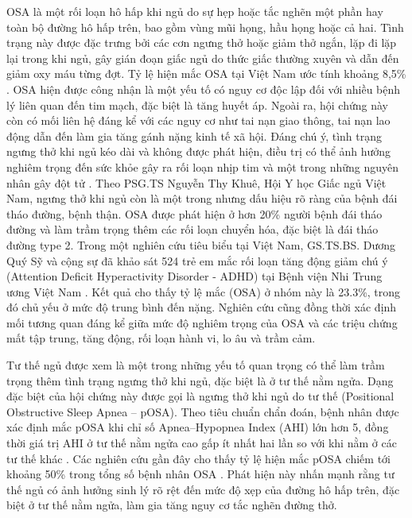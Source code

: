 OSA là một rối loạn hô hấp khi ngủ do sự hẹp hoặc tắc nghẽn một phần hay toàn
bộ đường hô hấp trên, bao gồm vùng mũi họng, hầu họng hoặc cả hai. Tình trạng
này được đặc trưng bởi các cơn ngưng thở hoặc giảm thở ngắn, lặp đi lặp lại
trong khi ngủ, gây gián đoạn giấc ngủ do thức giấc thường xuyên và dẫn đến giảm
oxy máu từng đợt. Tỷ lệ hiện mắc OSA tại Việt Nam ước tính khoảng 8,5\%
\cite{nguoimacOSA_VN}. OSA hiện được công nhận là một yếu tố có nguy cơ độc lập
đối với nhiều bệnh lý liên quan đến tim mạch, đặc biệt là tăng huyết áp. Ngoài
ra, hội chứng này còn có mối liên hệ đáng kể với các nguy cơ như tai nạn giao
thông, tai nạn lao động dẫn đến làm gia tăng gánh nặng kinh tế xã
hội\cite{osa_bike}\cite{Marin2005}. Đáng chú ý, tình trạng ngưng thở khi ngủ
kéo dài và không được phát hiện, điều trị có thể ảnh hưởng nghiêm trọng đến sức
khỏe gây ra rối loạn nhịp tim và một trong những nguyên nhân gây đột tử
\cite{sumarry_osa}. Theo PSG.TS Nguyễn Thy Khuê, Hội Y học Giấc ngủ Việt Nam,
ngưng thở khi ngủ còn là một trong nhưng dấu hiệu rõ ràng của bệnh đái tháo
đường, bệnh thận. OSA được phát hiện ở hơn 20\% người bệnh đái tháo đường và
làm trầm trọng thêm các rối loạn chuyển hóa, đặc biệt là đái tháo đường type 2.
Trong một nghiên cứu tiêu biểu tại Việt Nam, GS.TS.BS. Dương Quý Sỹ và cộng sự
đã khảo sát 524 trẻ em mắc rối loạn tăng động giảm chú ý (Attention Deficit
Hyperactivity Disorder - ADHD) tại Bệnh viện Nhi Trung ương Việt Nam
\cite{ThaySUCHildren}. Kết quả cho thấy tỷ lệ mắc (OSA) ở nhóm này là 23.3\%,
trong đó chủ yếu ở mức độ trung bình đến nặng. Nghiên cứu cũng đồng thời xác
định mối tương quan đáng kể giữa mức độ nghiêm trọng của OSA và các triệu chứng
mất tập trung, tăng động, rối loạn hành vi, lo âu và trầm cảm.

Tư thế ngủ được xem là một trong những yếu tố quan trọng có thể làm trầm trọng
thêm tình trạng ngưng thở khi ngủ, đặc biệt là ở tư thế nằm ngửa. Dạng đặc biệt
của hội chứng này được gọi là ngưng thở khi ngủ do tư thế (Positional
Obstructive Sleep Apnea – pOSA). Theo tiêu chuẩn chẩn đoán, bệnh nhân được xác
định mắc pOSA khi chỉ số Apnea–Hypopnea Index (AHI) lớn hơn 5, đồng thời giá
trị AHI ở tư thế nằm ngửa cao gấp ít nhất hai lần so với khi nằm ở các tư thế
khác \cite{heinzer2018}. Các nghiên cứu gần đây cho thấy tỷ lệ hiện mắc pOSA
chiếm tới khoảng 50\% trong tổng số bệnh nhân OSA \cite{sabil2020}. Phát hiện
này nhấn mạnh rằng tư thế ngủ có ảnh hưởng sinh lý rõ rệt đến mức độ xẹp của
đường hô hấp trên, đặc biệt ở tư thế nằm ngửa, làm gia tăng nguy cơ tắc nghẽn
đường thở.

